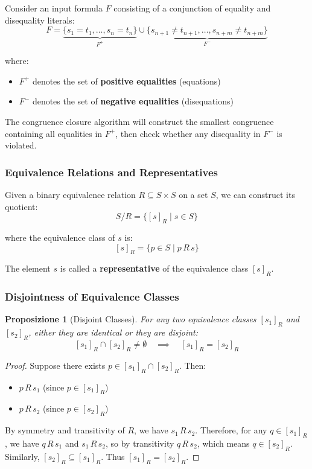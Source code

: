 \documentclass[11pt,a4paper]{article}
\theoremstyle{definition}
\theoremstyle{plain}
\newtheorem{proposition}[theorem]{Proposizione}
\theoremstyle{remark}
\begin{document}
Consider an input formula $F$ consisting of a conjunction of equality and disequality literals:
\[
F = \underbrace{\{s_1 = t_1, \dots, s_n = t_n\}}_{F^+} \cup \underbrace{\{s_{n+1} \neq t_{n+1}, \dots, s_{n+m} \neq t_{n+m}\}}_{F^-}
\]

where:
\begin{itemize}
    \item $F^+$ denotes the set of \textbf{positive equalities} (equations)
    \item $F^-$ denotes the set of \textbf{negative equalities} (disequations)
\end{itemize}

The congruence closure algorithm will construct the smallest congruence containing all equalities in $F^+$, then check whether any disequality in $F^-$ is violated.

\subsubsection{Equivalence Relations and Representatives}

Given a binary equivalence relation $R \subseteq S \times S$ on a set $S$, we can construct its quotient:
\[
S/R = \{[s]_R \mid s \in S\}
\]

where the equivalence class of $s$ is:
\[
[s]_R = \{p \in S \mid p \, R \, s\}
\]

The element $s$ is called a \textbf{representative} of the equivalence class $[s]_R$.

\subsubsection{Disjointness of Equivalence Classes}

\begin{proposition}[Disjoint Classes]
For any two equivalence classes $[s_1]_R$ and $[s_2]_R$, either they are identical or they are disjoint:
\[
[s_1]_R \cap [s_2]_R \neq \emptyset \quad \implies \quad [s_1]_R = [s_2]_R
\]
\end{proposition}

\begin{proof}
Suppose there exists $p \in [s_1]_R \cap [s_2]_R$. Then:
\begin{itemize}
    \item $p \, R \, s_1$ (since $p \in [s_1]_R$)
    \item $p \, R \, s_2$ (since $p \in [s_2]_R$)
\end{itemize}

By symmetry and transitivity of $R$, we have $s_1 \, R \, s_2$. Therefore, for any $q \in [s_1]_R$, we have $q \, R \, s_1$ and $s_1 \, R \, s_2$, so by transitivity $q \, R \, s_2$, which means $q \in [s_2]_R$. Similarly, $[s_2]_R \subseteq [s_1]_R$. Thus $[s_1]_R = [s_2]_R$.
\end{proof}
\end{document}
